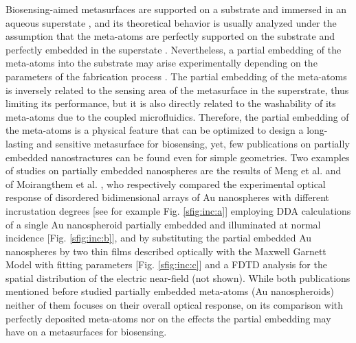 Biosensing-aimed metasurfaces are supported on a substrate and immersed in an aqueous superstate \cite{estevez_trends_2014}, and its theoretical behavior is usually analyzed under the assumption that the meta-atoms are perfectly supported on the substrate and perfectly embedded in the superstate  \cite{kabashin_plasmonic_2009,qiu_differential_2015,barrera1991optical,svedendahl_refractometric_2014,bedeaux_optical_2004}. Nevertheless, a partial embedding of the meta-atoms into the substrate may arise experimentally depending on the parameters of the fabrication process  \cite{meng_anisotropic_2015,moirangthem_enhanced_2012}. The partial embedding of the meta-atoms is inversely related to the sensing area of the metasurface in the superstrate, thus limiting its performance, but it is also directly related to the washability of its meta-atoms due to the coupled microfluidics. Therefore, the partial embedding of the meta-atoms is a physical feature that can be optimized to design a long-lasting and sensitive metasurface for biosensing, yet, few publications on partially embedded nanostractures can be found even for simple geometries. Two examples of studies on partially embedded nanospheres are the results of Meng et al. \cite{meng_anisotropic_2015} and of Moirangthem et al. \cite{moirangthem_enhanced_2012}, who respectively compared the experimental optical response of disordered bidimensional arrays of Au nanospheres with different incrustation degrees [see for example Fig. \ref{sfig:inc:a}] employing DDA calculations of a single Au nanospheroid partially embedded and illuminated at normal incidence [Fig. \ref{sfig:inc:b}], and by substituting the partial embedded Au nanospheres by two thin films described optically with the Maxwell Garnett Model with fitting parameters [Fig. \ref{sfig:inc:c}] and a FDTD analysis for the spatial distribution of the electric near-field (not shown). While both publications mentioned before studied partially embedded meta-atoms (Au nanospheroids) neither of them focuses on their overall optical response,  on its comparison with perfectly deposited meta-atoms nor on the effects the partial embedding may have on a metasurfaces for biosensing.

